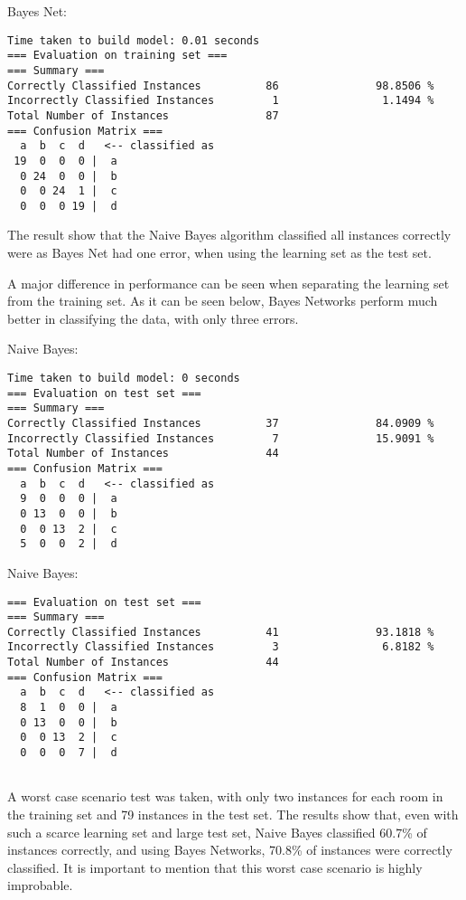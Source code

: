 \noindent Bayes Net:
\begin{lstlisting}
Time taken to build model: 0.01 seconds
=== Evaluation on training set ===
=== Summary ===
Correctly Classified Instances          86               98.8506 %
Incorrectly Classified Instances         1                1.1494 %
Total Number of Instances               87     
=== Confusion Matrix ===
  a  b  c  d   <-- classified as
 19  0  0  0 |  a
  0 24  0  0 |  b
  0  0 24  1 |  c
  0  0  0 19 |  d
\end{lstlisting}
The result show that the Naive Bayes algorithm classified all instances correctly were as Bayes Net had one error, when using the learning set as the test set.

A major difference in performance can be seen when separating the learning set from the training set. As it can be seen below, Bayes Networks perform much better in classifying the data, with only three errors.

\noindent Naive Bayes:
\begin{lstlisting}
Time taken to build model: 0 seconds
=== Evaluation on test set ===
=== Summary ===
Correctly Classified Instances          37               84.0909 %
Incorrectly Classified Instances         7               15.9091 %
Total Number of Instances               44     
=== Confusion Matrix ===
  a  b  c  d   <-- classified as
  9  0  0  0 |  a
  0 13  0  0 |  b
  0  0 13  2 |  c
  5  0  0  2 |  d
\end{lstlisting}

\noindent Naive Bayes:
\begin{lstlisting}
=== Evaluation on test set ===
=== Summary ===
Correctly Classified Instances          41               93.1818 %
Incorrectly Classified Instances         3                6.8182 %
Total Number of Instances               44     
=== Confusion Matrix ===
  a  b  c  d   <-- classified as
  8  1  0  0 |  a
  0 13  0  0 |  b
  0  0 13  2 |  c
  0  0  0  7 |  d


\end{lstlisting}

A worst case scenario test was taken, with only two instances for each room in the training set and 79 instances in the test set. The results show that, even with such a scarce learning set and large test set, Naive Bayes classified 60.7\% of instances correctly, and using Bayes Networks, 70.8\% of instances were correctly classified. It is important to mention that this worst case scenario is highly improbable.

